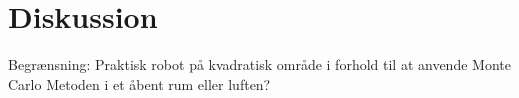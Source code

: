 \documentclass[../../SRP.tex]{subfiles}
\begin{document}
\chapter{Diskussion}

Begrænsning: Praktisk robot på kvadratisk område i forhold til at anvende Monte Carlo Metoden i et åbent rum eller luften? 
\end{document}
